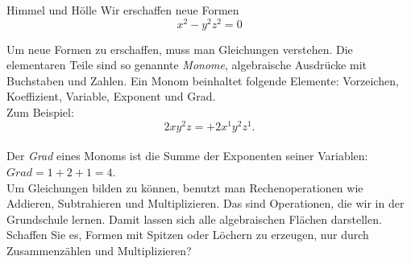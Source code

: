 \begin{surferPage}{Himmel und Hölle}
Wir erschaffen neue Formen \\
\smallskip
\[x^2	- y^2z^2	= 0\]

\singlespacing
Um neue Formen zu erschaffen, muss man Gleichungen verstehen. Die elementaren Teile sind so genannte  {\it Monome}, algebraische Ausdrücke mit Buchstaben und Zahlen.
\singlespacing
Ein Monom beinhaltet folgende Elemente:
Vorzeichen, Koeffizient, Variable, Exponent und Grad.\\
\singlespacing
Zum Beispiel: 
\smallskip
\[2xy^2z = +2x^1y^2z^1.\]
\\
\smallskip
Der  {\it Grad} eines Monoms ist die Summe der Exponenten seiner Variablen: $Grad = 1+2+1=4$.  \\
\singlespacing
Um Gleichungen bilden zu können, benutzt man Rechenoperationen wie Addieren, Subtrahieren und Multiplizieren. Das sind Operationen, die wir in der Grundschule lernen. Damit lassen sich alle algebraischen Flächen darstellen.
\singlespacing
Schaffen Sie es, Formen mit Spitzen oder Löchern zu erzeugen, nur durch Zusammenzählen und Multiplizieren?
\end{surferPage}
